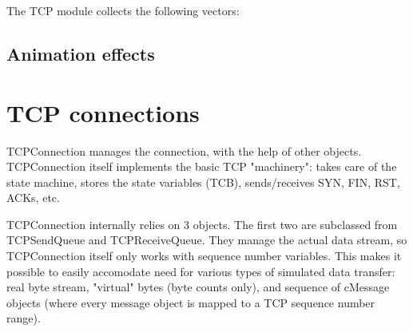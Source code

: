 The TCP module collects the following vectors:
\begin{compactitem}
  \item {}
  \item {}
  \item {}
  \item {}
  \item {}
  \item {}
  \item {}
  \item {}
  \item {}
  \item {}
  \item {}
  \item {}
  \item {}
  \item {}
  \item {}
  \item {}
  \item {}
\end{compactitem}


\subsection{Animation effects}

\section{TCP connections}

TCPConnection manages the connection, with the help of other objects.
TCPConnection itself implements the basic TCP "machinery": takes care
of the state machine, stores the state variables (TCB), sends/receives
SYN, FIN, RST, ACKs, etc.

TCPConnection internally relies on 3 objects. The first two are subclassed
from TCPSendQueue and TCPReceiveQueue. They manage the actual data stream,
so TCPConnection itself only works with sequence number variables.
This makes it possible to easily accomodate need for various types of
simulated data transfer: real byte stream, "virtual" bytes (byte counts
only), and sequence of cMessage objects (where every message object is
mapped to a TCP sequence number range).

